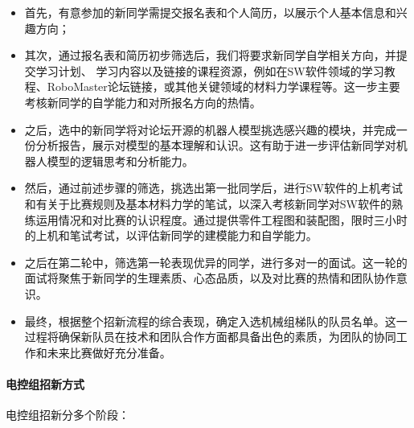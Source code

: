 
                \begin{itemize}
                    \item 首先，有意参加的新同学需提交报名表和个人简历，以展示个人基本信息和兴趣方向；
                    \item 其次，通过报名表和简历初步筛选后，我们将要求新同学自学相关方向，并提交学习计划、 学习内容以及链接的课程资源，例如在SW软件领域的学习教程、RoboMaster论坛链接，或其他关键领域的材料力学课程等。这一步主要考核新同学的自学能力和对所报名方向的热情。
                    \item 之后，选中的新同学将对论坛开源的机器人模型挑选感兴趣的模块，并完成一份分析报告，展示对模型的基本理解和认识。这有助于进一步评估新同学对机器人模型的逻辑思考和分析能力。
                    \item 然后，通过前述步骤的筛选，挑选出第一批同学后，进行SW软件的上机考试和有关于比赛规则及基本材料力学的笔试，以深入考核新同学对SW软件的熟练运用情况和对比赛的认识程度。通过提供零件工程图和装配图，限时三小时的上机和笔试考试，以评估新同学的建模能力和自学能力。 
                    \item 之后在第二轮中，筛选第一轮表现优异的同学，进行多对一的面试。这一轮的面试将聚焦于新同学的生理素质、心态品质，以及对比赛的热情和团队协作意识。 
                    \item 最终，根据整个招新流程的综合表现，确定入选机械组梯队的队员名单。这一过程将确保新队员在技术和团队合作方面都具备出色的素质，为团队的协同工作和未来比赛做好充分准备。
                \end{itemize}

            \paragraph{电控组招新方式}

                电控组招新分多个阶段：


